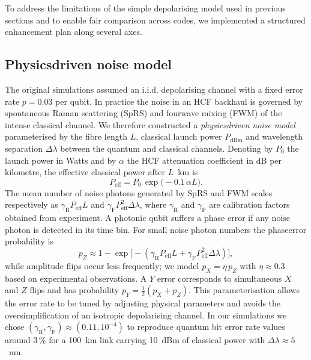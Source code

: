 \documentclass[conference]{IEEEtran}  %
\begin{document}
To address the limitations of the simple depolarising model used in previous sections and to enable fair comparison across codes, we implemented a structured enhancement plan along several axes.

\subsection{Physics\textendash driven noise model}
The original simulations assumed an i.i.d. depolarising channel with a fixed error rate $p=0.03$ per qubit.  In practice the noise in an HCF backhaul is governed by spontaneous Raman scattering (SpRS) and four\textendash wave mixing (FWM) of the intense classical channel.  We therefore constructed a \emph{physics\textendash driven noise model} parameterised by the fibre length $L$, classical launch power $P_{\text{dBm}}$ and wavelength separation $\Delta\lambda$ between the quantum and classical channels.  Denoting by $P_0$ the launch power in Watts and by $\alpha$ the HCF attenuation coefficient in dB per kilometre, the effective classical power after $L$~km is
\begin{equation}
  P_{\text{eff}} = P_0\,\exp\bigl(-0.1\,\alpha L\bigr).
\end{equation}
The mean number of noise photons generated by SpRS and FWM scales respectively as $\gamma_{\mathrm{R}} P_{\text{eff}} L$ and $\gamma_{\mathrm{F}} P_{\text{eff}}^2 \Delta\lambda$, where $\gamma_{\mathrm{R}}$ and $\gamma_{\mathrm{F}}$ are calibration factors obtained from experiment.  A photonic qubit suffers a phase error if any noise photon is detected in its time bin.  For small noise photon numbers the phase\textendash error probability is
\begin{equation}
  p_Z \approx 1 - \exp\bigl[-(\gamma_{\mathrm{R}} P_{\text{eff}} L + \gamma_{\mathrm{F}} P_{\text{eff}}^2 \Delta\lambda)\bigr],
\end{equation}
while amplitude flips occur less frequently; we model $p_X = \eta\,p_Z$ with $\eta\approx 0.3$ based on experimental observations.  A $Y$ error corresponds to simultaneous $X$ and $Z$ flips and has probability $p_Y = \tfrac{1}{2}(p_X+p_Z)$.  This parameterisation allows the error rate to be tuned by adjusting physical parameters and avoids the over\textendash simplification of an isotropic depolarising channel.  In our simulations we chose $(\gamma_{\mathrm{R}},\gamma_{\mathrm{F}})\approx(0.11,10^{-4})$ to reproduce quantum bit error rate values around $3\,\%$ for a 100~km link carrying 10~dBm of classical power with $\Delta\lambda\approx 5$~nm.
\end{document}
